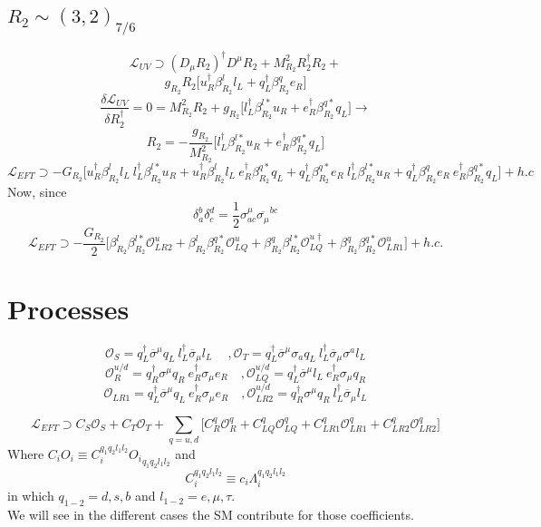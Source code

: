 \documentclass{article}
\begin{document}
\subsection{$R_2 \sim (3,2)_{7/6}$}
\[
\mathcal{L}_{UV} \supset  (D_\mu R_2)^\dagger D^\mu R_2 + M^2_{R_2} R_2^\dagger R_2 +
\]
\[
g_{R_2} R_2 \big[u_R^\dagger \beta_{R_2}^l l_L + q_L^\dagger \beta_{R_2}^q e_R \big]
\]
\[
\frac{\delta \mathcal{L}_{UV}}{\delta R_2^\dagger}=0= M_{R_2}^2 R_2 + g_{R_2}\big[l_L^\dagger\beta_{R_2}^{l*} u_R  + e_R^\dagger\beta_{R_2}^{q*} q_L \big] \rightarrow
\]
\[
R_2 = - \frac{g_{R_2}}{M^2_{R_2}} \big[l_L^\dagger \beta_{R_2}^{l*} u_R  + e_R^\dagger \beta_{R_2}^{q*} q_L \big]
\]
\[
\mathcal{L}_{EFT} \supset -G_{R_2} \big[ u_R^\dagger\beta_{R_2}^l l_L \ l_L^\dagger \beta_{R_2}^{l*} u_R + u_R^\dagger \beta_{R_2}^l l_L \ e_R^\dagger \beta_{R_2}^{q*} q_L  + q_L^\dagger \beta_{R_2}^{q*} e_R \   l_L^\dagger \beta_{R_2}^{l*} u_R + q_L^\dagger \beta_{R_2}^q e_R \ e_R^\dagger \beta_{R_2}^{q*} q_L \big] +h.c
\]
Now, since  
\[
\delta_a^b \delta_c^d = \frac{1}{2} \sigma^\mu_{ac} \overline{\sigma_\mu}^{bc}
\]
\[
\mathcal{L}_{EFT} \supset -\frac{G_{R_2}}{2} \big[ \beta_{R_2}^l  \beta_{R_2}^{l*} \mathcal{O}_{LR2}^u +  \beta_{R_2}^l \beta_{R_2}^{q*}  \mathcal{O}_{LQ}^u + \beta_{R_2}^{q}  \beta_{R_2}^{l*} \mathcal{O}_{LQ}^{u\dagger} +  \beta_{R_2}^q    \beta_{R_2}^{q*} \mathcal{O}_{LR1}^u  \big]
 +h.c.
\]
\section{Processes}
\[
\mathcal{O}_S= q_L^\dagger \overline{\sigma}^\mu q_L \ l_L^\dagger \overline{\sigma}_\mu l_L \  \quad,\mathcal{O}_T=q_L^\dagger \overline{\sigma}^\mu  \sigma_a q_L \ l_L^\dagger \overline{\sigma}_\mu \sigma^a l_L
\]
\[
\mathcal{O}^{u/d}_R = q_R^\dagger \sigma^\mu q_R \ e_R^\dagger \sigma_\mu e_R \quad, \mathcal{O}_{LQ}^{u/d}= q_L^\dagger \overline{\sigma}^\mu l_L \ e_R^\dagger \sigma_\mu q_R
\]
\[
\mathcal{O}_{LR1}= q_L^\dagger \overline{\sigma}^\mu q_L \ e_R^\dagger \sigma_\mu e_R \quad, \mathcal{O}_{LR2}^{u/d}= q_R^\dagger \sigma^\mu q_R \ l_L^\dagger \overline{\sigma}_\mu l_L 
\]

\[
\mathcal{L}_{EFT} \supset C_S \mathcal{O}_S + C_T \mathcal{O}_T + \sum_{q=u,d}\big[C_{R}^q \mathcal{O}_{R}^q + C_{LQ}^q \mathcal{O}_{LQ}^q + C_{LR1}^q \mathcal{O}_{LR1}^q + C_{LR2}^q \mathcal{O}_{LR2}^q \big]
\]
Where $C_i O_i \equiv C^{q_1 q_2 l_1 l_2}_i {O_i}_{q_1 q_2 l_1 l_2}$ and
\[
C_i^{q_1 q_2 l_1 l_2} \equiv c_i \Lambda_i^{q_1 q_2 l_1 l_2}
\]
in which $q_{1-2}=d,s,b$ and $l_{1-2}= e,\mu , \tau$.\\
We will see in the different cases the SM contribute for those coefficients.\\
\end{document}
